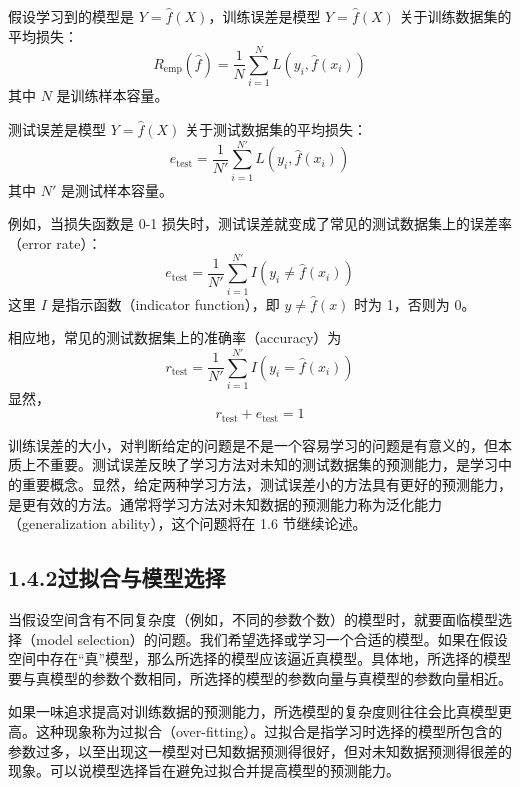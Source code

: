 \documentclass[UTF8, 12pt, fontset=fandol, oneside]{ctexart}
\begin{document}
假设学习到的模型是 $Y=\hat f(X)$，训练误差是模型 $Y=\hat f(X)$ 关于训练数据集的平均损失：
\begin{equation}
  R_{\mathrm{emp}}(\hat f)=\frac1N\sum_{i=1}^N L(y_i,\hat f(x_i))
  \tag{1.18}
\end{equation}
其中 $N$ 是训练样本容量。

测试误差是模型 $Y=\hat f(X)$ 关于测试数据集的平均损失：
\begin{equation}
  e_{\mathrm{test}}=\frac1{N'}\sum_{i=1}^{N'} L(y_i,\hat f(x_i))
  \tag{1.19}
\end{equation}
其中 $N'$ 是测试样本容量。

例如，当损失函数是 0-1 损失时，测试误差就变成了常见的测试数据集上的误差率（error rate）：
\begin{equation}
  e_{\mathrm{test}}=\frac1{N'}\sum_{i=1}^{N'} I(y_i\ne\hat f(x_i))
  \tag{1.20}
\end{equation}
这里 $I$ 是指示函数（indicator function），即 $y\ne\hat f(x)$ 时为 1，否则为 0。

相应地，常见的测试数据集上的准确率（accuracy）为
\begin{equation}
  r_{\mathrm{test}}=\frac1{N'}\sum_{i=1}^{N'} I(y_i=\hat f(x_i))
  \tag{1.21}
\end{equation}
显然，
\[
  r_{\mathrm{test}}+e_{\mathrm{test}}=1
\]

训练误差的大小，对判断给定的问题是不是一个容易学习的问题是有意义的，但本质上不重要。测试误差反映了学习方法对未知的测试数据集的预测能力，是学习中的重要概念。显然，给定两种学习方法，测试误差小的方法具有更好的预测能力，是更有效的方法。通常将学习方法对未知数据的预测能力称为泛化能力（generalization ability），这个问题将在 1.6 节继续论述。

\subsection*{1.4.2\quad 过拟合与模型选择}

当假设空间含有不同复杂度（例如，不同的参数个数）的模型时，就要面临模型选择（model selection）的问题。我们希望选择或学习一个合适的模型。如果在假设空间中存在“真”模型，那么所选择的模型应该逼近真模型。具体地，所选择的模型要与真模型的参数个数相同，所选择的模型的参数向量与真模型的参数向量相近。

如果一味追求提高对训练数据的预测能力，所选模型的复杂度则往往会比真模型更高。这种现象称为过拟合（over-fitting）。过拟合是指学习时选择的模型所包含的参数过多，以至出现这一模型对已知数据预测得很好，但对未知数据预测得很差的现象。可以说模型选择旨在避免过拟合并提高模型的预测能力。
\end{document}
